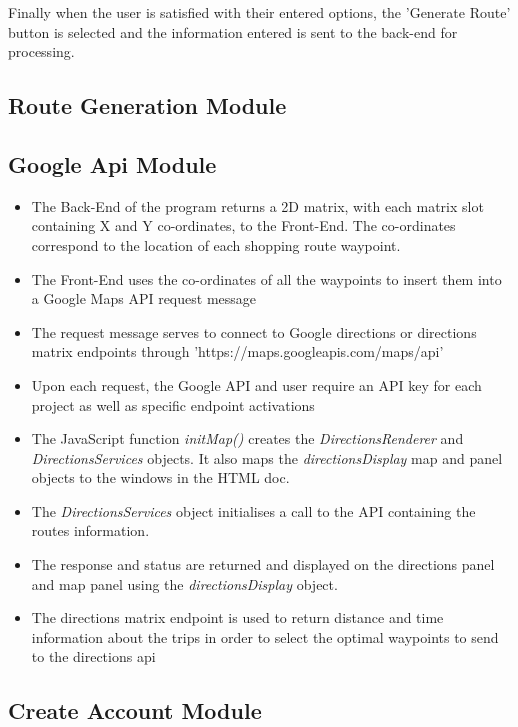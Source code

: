 \documentclass[10pt, a4paper, twocolumn]{scrartcl}
\begin{document}
		Finally when the user is satisfied with their entered options, the 'Generate Route' button is selected and the information entered is sent to the back-end for processing.
		
		\subsection{Route Generation Module}
		
		
		
		\subsection{Google Api Module}
		
				\begin{itemize}
					\item The Back-End of the program returns a 2D matrix, with each matrix slot containing X and Y co-ordinates, to the Front-End. The co-ordinates correspond to the location of each shopping route waypoint. 
					\item The Front-End uses the co-ordinates of all the waypoints to insert them into a Google Maps API request message
					\item The request message serves to connect to Google directions or directions matrix endpoints through 'https://maps.googleapis.com/maps/api'
					\item Upon each request, the Google API and user require an API key for each project as well as specific endpoint activations
					\item The JavaScript function \textit{initMap()} creates the \textit{DirectionsRenderer} and \textit{DirectionsServices} objects. It also maps the \textit{directionsDisplay} map and panel objects to the windows in the HTML doc.
					\item The \textit{DirectionsServices} object initialises a call to the API containing the routes information.
					\item The response and status are returned and displayed on the directions panel and map panel using the \textit{directionsDisplay} object.
					\item The directions matrix endpoint is used to return distance and time information about the trips in order to select the optimal waypoints to send to the directions api
				\end{itemize}
				
		
		\subsection{Create Account Module}
		
\end{document}
